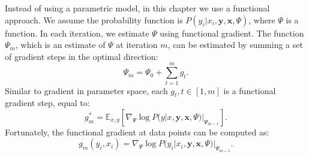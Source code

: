 	Instead of using a parametric model, in this chapter we use a functional approach. We assume the probability function is $P(y_i | x_i, \mathbf{y}, \mathbf{x}, \Psi)$, where $\Psi$ is a function. In each iteration, we estimate $\Psi$ using functional gradient. The function $\Psi_m$, which is an estimate of $\Psi$ at iteration $m$, can be estimated by summing a set of gradient steps in the optimal direction:
	\begin{equation}
		\Psi_m = \Psi_0 + \sum_{t=1}^{m} g_t.
	\end{equation}
	Similar to gradient in parameter space, each $g_t, t \in [1, m]$ is a functional gradient step, equal to:
	\begin{equation}
		g_m^* = \mathbb{E}_{x,y} [ \nabla_\Psi \log P(y | x, \mathbf{y}, \mathbf{x}, \Psi) |_{\Psi_{m-1}} ].
	\end{equation}
	Fortunately, the functional gradient at data points can be computed as:
	\begin{equation}
		g_m(y_i, x_i) = \nabla_\Psi \log P(y_i | x_i, \mathbf{y}, \mathbf{x}, \Psi) |_{\Psi_{m-1}}.
	\end{equation}
	
